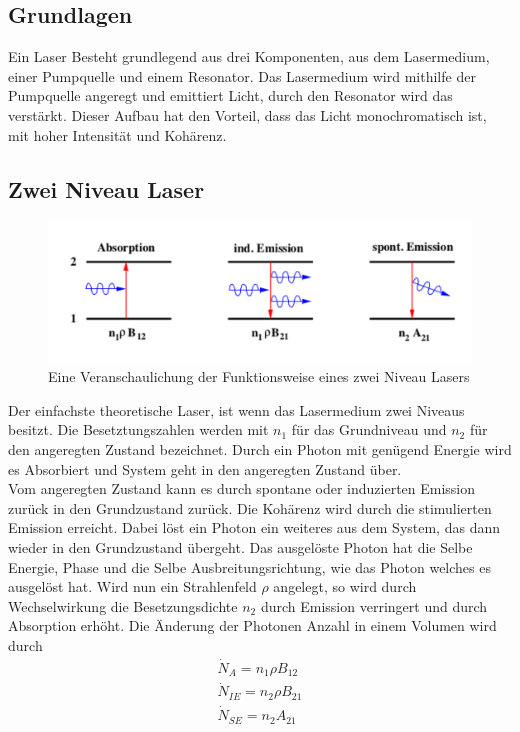 
\subsection{Grundlagen}

Ein Laser Besteht grundlegend aus drei Komponenten, aus dem Lasermedium, einer Pumpquelle und einem Resonator. Das Lasermedium wird mithilfe der Pumpquelle angeregt und emittiert Licht, durch den Resonator wird das verstärkt. Dieser Aufbau hat den Vorteil, dass das Licht monochromatisch ist, mit hoher Intensität und Kohärenz.
\subsection{Zwei Niveau Laser}
\begin{figure}
\centering
\includegraphics[scale=0.75]{../Grafiken/Emission.pdf}
\caption{Eine Veranschaulichung der Funktionsweise eines zwei Niveau Lasers\cite{V61}}\label{Emission}
\end{figure}
Der einfachste theoretische Laser, ist wenn das Lasermedium  zwei Niveaus besitzt. Die Besetztungszahlen werden mit $n_1$ für das Grundniveau und $n_2$ für den angeregten Zustand bezeichnet. Durch ein Photon mit genügend Energie wird es Absorbiert und System geht in den angeregten Zustand über.\\
Vom angeregten Zustand kann es durch spontane oder induzierten Emission zurück in den Grundzustand zurück. Die Kohärenz wird durch die stimulierten Emission erreicht. Dabei löst ein Photon ein weiteres aus dem System, das dann wieder in den Grundzustand übergeht. Das ausgelöste Photon hat die Selbe Energie, Phase und die Selbe Ausbreitungsrichtung, wie das Photon welches es ausgelöst hat. Wird nun ein Strahlenfeld $\rho$ angelegt, so wird durch Wechselwirkung die Besetzungsdichte $n_2$ durch Emission verringert und durch Absorption erhöht.
Die Änderung der Photonen Anzahl in einem Volumen wird durch
\begin{align*}
\dot{N}_A=n_1 \rho B_{12}\\
\dot{N}_{IE}=n_2\rho B_{21}\\
\dot{N}_{SE}=n_2A_{21}
\end{align*}
